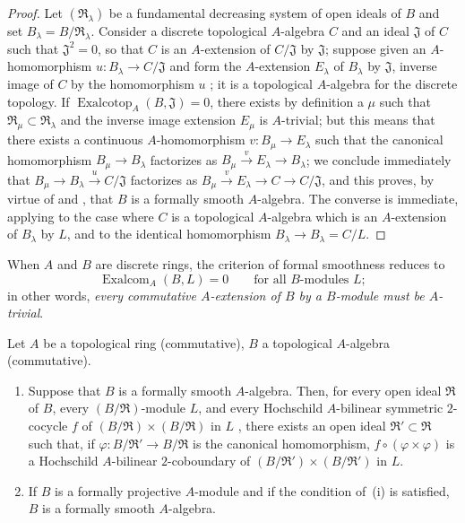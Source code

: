 \begin{proof}
Let $(\mathfrak{R}_\lambda)$ be a fundamental decreasing system of open ideals of $B$ and set $B_\lambda=B/\mathfrak{R}_\lambda$.
Consider a discrete topological $A$-algebra $C$ and an ideal $\mathfrak{J}$ of $C$ such that $\mathfrak{J}^2=0$, so that $C$ is an $A$-extension of $C/\mathfrak{J}$ by $\mathfrak{J}$;
suppose given an $A$-homomorphism $u:B_\lambda\to C/\mathfrak{J}$ and form the $A$-extension $E_\lambda$ of $B_\lambda$ by $\mathfrak{J}$, inverse image of $C$ by the homomorphism $u$ ;
it is a topological $A$-algebra for the discrete topology.
If $\operatorname{Exalcotop}_A(B,\mathfrak{J})=0$, there exists by definition  a $\mu$ such that $\mathfrak{R}_\mu\subset\mathfrak{R}_\lambda$ and the inverse image extension $E_\mu$ is $A$-trivial;
but this means  that there exists a continuous $A$-homomorphism $v:B_\mu\to E_\lambda$ such that the canonical homomorphism $B_\mu\to B_\lambda$ factorizes as $B_\mu\xrightarrow{v}E_\lambda\to B_\lambda$;
we conclude immediately that $B_\mu\to B_\lambda\xrightarrow{u}C/\mathfrak{J}$ factorizes as $B_\mu\xrightarrow{v}E_\lambda\to C\to C/\mathfrak{J}$,
and this proves, by virtue of  and , that $B$ is a formally smooth $A$-algebra.
The converse is immediate, applying  to the case where $C$ is a topological $A$-algebra which is an $A$-extension of $B_\lambda$ by $L$, and to the identical homomorphism $B_\lambda\to B_\lambda=C/L$.
\end{proof}

When $A$ and $B$ are discrete rings, the criterion of formal smoothness  reduces to
\begin{equation}
\tag{19.4.4.1}
\label{0.19.4.4.1}
\operatorname{Exalcom}_A(B,L)=0 \qquad\text{for all $B$-modules $L$};
\end{equation}
in other words, \emph{every commutative $A$-extension of $B$ by a $B$-module must be $A$-trivial}.

\begin{corollary}[19.4.5]
\label{0.19.4.5}
Let $A$ be a topological ring (commutative), $B$ a topological $A$-algebra (commutative).
\begin{enumerate}
  \item[\rm(i)] Suppose that $B$ is a formally smooth $A$-algebra. Then, for every open ideal $\mathfrak{R}$ of $B$, every $(B/\mathfrak{R})$-module $L$, and every Hochschild $A$-bilinear symmetric $2$-cocycle $f$ of $(B/\mathfrak{R})\times(B/\mathfrak{R})$ in $L$ , there exists an open ideal $\mathfrak{R}'\subset\mathfrak{R}$ such that, if $\varphi:B/\mathfrak{R}'\to B/\mathfrak{R}$ is the canonical homomorphism, $f\circ(\varphi\times\varphi)$ is a Hochschild $A$-bilinear $2$-coboundary of $(B/\mathfrak{R}')\times(B/\mathfrak{R}')$ in $L$.
  \item[\rm(ii)] If $B$ is a formally projective $A$-module  and if the condition of~{\rm(i)} is satisfied, $B$ is a formally smooth $A$-algebra.
\end{enumerate}
\end{corollary}

